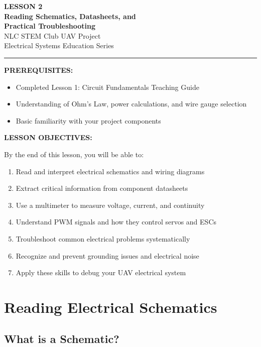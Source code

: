\documentclass[11pt,letterpaper]{article}
\begin{document}
\begin{center}
{\Huge \textbf{LESSON 2}}\\[0.5em]
{\LARGE \textbf{Reading Schematics, Datasheets, and}}\\
{\LARGE \textbf{Practical Troubleshooting}}\\[0.5em]
{\large NLC STEM Club UAV Project}\\
{\large Electrical Systems Education Series}\\[0.5em]
\rule{\textwidth}{2pt}
\end{center}

\begin{conceptbox}
\textbf{PREREQUISITES:}
\begin{itemize}[nosep]
\item Completed Lesson 1: Circuit Fundamentals Teaching Guide
\item Understanding of Ohm's Law, power calculations, and wire gauge selection
\item Basic familiarity with your project components
\end{itemize}
\end{conceptbox}

\begin{conceptbox}
\textbf{LESSON OBJECTIVES:}

By the end of this lesson, you will be able to:
\begin{enumerate}[nosep]
\item Read and interpret electrical schematics and wiring diagrams
\item Extract critical information from component datasheets
\item Use a multimeter to measure voltage, current, and continuity
\item Understand PWM signals and how they control servos and ESCs
\item Troubleshoot common electrical problems systematically
\item Recognize and prevent grounding issues and electrical noise
\item Apply these skills to debug your UAV electrical system
\end{enumerate}
\end{conceptbox}

\newpage
\section{Reading Electrical Schematics}

\subsection{What is a Schematic?}
\end{document}
